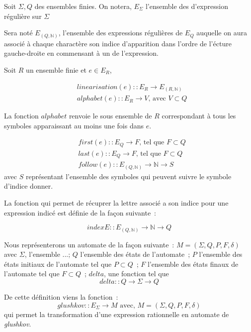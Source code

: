 \documentclass{article}
\begin{document}
Soit \(\Sigma, Q\) des ensembles finies. On notera, \(E_{\Sigma}\) l'ensemble 
des d'expression régulière sur \(\Sigma\)

Sera noté \(E_{(Q, \mathbb{N})}\), l'ensemble des expressions régulières de 
\(E_Q\) auquelle on aura associé à chaque charactère son indice d'apparition 
dans l'ordre de l'écture gauche-droite en commensant à un de l'expression.

Soit \(R\) un ensemble finie et \(e \in E_R\),

\begin{equation*}
  \begin{split}
  & linearisation(e) :: E_R \to E_{(R, \mathbb{N})} \\
  & alphabet(e) :: E_R \to V \text{, avec } V \subset Q
  \end{split}
\end{equation*}

La fonction \(alphabet\) renvoie le sous ensemble de \(R\) correspondant à tous 
les symboles apparaissant au moins une fois dans \(e\).

\begin{equation*}
  \begin{split}
  & first(e) :: E_Q \to F \text{, tel que } F \subset Q \\
  & last(e) :: E_Q \to F \text{, tel que } F \subset Q \\
  & follow(e) :: E_{(Q, \mathbb{N})} \to \mathbb{N} \to S 
  \end{split}
\end{equation*}
avec \(S\) représentant l'ensemble des symboles qui peuvent suivre le symbole 
d'indice donner.

La fonction qui permet de récuprer la lettre associé a son indice pour une 
expression indicé est définie de la façon suivante~:

\[
indexE :: E_{(Q, \mathbb{N})} \to \mathbb{N} \to Q
\]

Nous représenterons un automate de la façon suivante~: 
\(M = (\Sigma, Q, P, F, \delta)\) avec \(\Sigma\), l'ensemble ...; \(Q\) 
l'ensemble des états de l'automate~; \(P\) l'ensemble des états initiaux de 
l'automate tel que \(P \subset Q\)~; \(F\) l'ensemble des états finaux de 
l'automate tel que \(F \subset Q\)~; \(delta\), une fonction tel que
\[
  delta :: Q \to \Sigma \to Q
\]

De cette définition viens la fonction~:
\[
  glushkov :: E_{\Sigma} \to M \text{ avec, } M = (\Sigma, Q, P, F, \delta)
\]
qui permet la transformation d'une expression rationnelle en automate de 
\textit{glushkov}.
\end{document}

